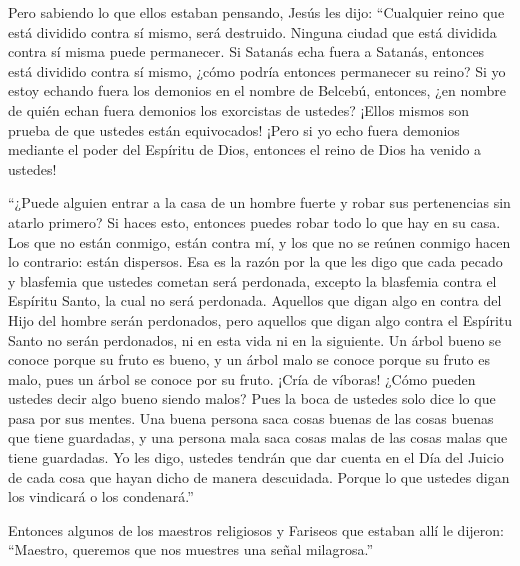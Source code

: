  Pero sabiendo lo que ellos estaban pensando, Jesús les
dijo: ``Cualquier reino que está dividido contra sí mismo, será
destruido. Ninguna ciudad que está dividida contra sí misma puede
permanecer.  Si Satanás echa fuera a Satanás, entonces está
dividido contra sí mismo, ¿cómo podría entonces permanecer su reino?
 Si yo estoy echando fuera los demonios en el nombre de
Belcebú, entonces, ¿en nombre de quién echan fuera demonios los
exorcistas de ustedes? ¡Ellos mismos son prueba de que ustedes están
equivocados!  ¡Pero si yo echo fuera demonios mediante el
poder del Espíritu de Dios, entonces el reino de Dios ha venido a
ustedes!

 ``¿Puede alguien entrar a la casa de un hombre fuerte y
robar sus pertenencias sin atarlo primero? Si haces esto, entonces
puedes robar todo lo que hay en su casa.  Los que no están
conmigo, están contra mí, y los que no se reúnen conmigo hacen lo
contrario: están dispersos.  Esa es la razón por la que les
digo que cada pecado y blasfemia que ustedes cometan será perdonada,
excepto la blasfemia contra el Espíritu Santo, la cual no será
perdonada.  Aquellos que digan algo en contra del Hijo del
hombre serán perdonados, pero aquellos que digan algo contra el Espíritu
Santo no serán perdonados, ni en esta vida ni en la siguiente.
 Un árbol bueno se conoce porque su fruto es bueno, y un
árbol malo se conoce porque su fruto es malo, pues un árbol se conoce
por su fruto.  ¡Cría de víboras! ¿Cómo pueden ustedes decir
algo bueno siendo malos? Pues la boca de ustedes solo dice lo que pasa
por sus mentes.  Una buena persona saca cosas buenas de las
cosas buenas que tiene guardadas, y una persona mala saca cosas malas de
las cosas malas que tiene guardadas.  Yo les digo, ustedes
tendrán que dar cuenta en el Día del Juicio de cada cosa que hayan dicho
de manera descuidada.  Porque lo que ustedes digan los
vindicará o los condenará.''

 Entonces algunos de los maestros religiosos y Fariseos que
estaban allí le dijeron: ``Maestro, queremos que nos muestres una señal
milagrosa.''

